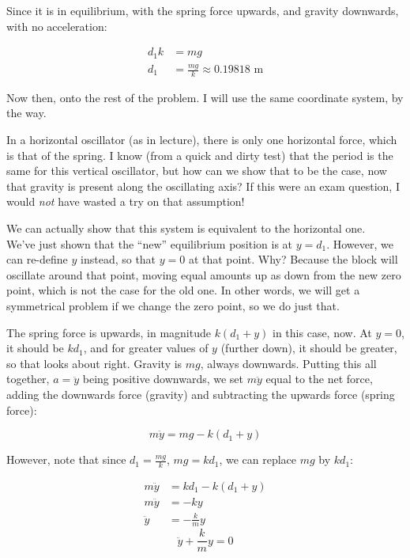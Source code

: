 \documentclass[8.01x]{subfiles}
\begin{document}
Since it is in equilibrium, with the spring force upwards, and gravity downwards, with no acceleration:

\begin{align}
d_1 k &= m g\\
d_1 &= \frac{m g}{k} \approx 0.19818 \text{ m}
\end{align}

Now then, onto the rest of the problem. I will use the same coordinate system, by the way.

In a horizontal oscillator (as in lecture), there is only one horizontal force, which is that of the spring. I know (from a quick and dirty test) that the period is the same for this vertical oscillator, but how can we show that to be the case, now that gravity is present along the oscillating axis? If this were an exam question, I would \emph{not} have wasted a try on that assumption!

We can actually show that this system is equivalent to the horizontal one.\\
We've just shown that the ``new'' equilibrium position is at $y = d_1$. However, we can re-define $y$ instead, so that $y = 0$ at that point. Why? Because the block will oscillate around that point, moving equal amounts up as down from the new zero point, which is not the case for the old one. In other words, we will get a symmetrical problem if we change the zero point, so we do just that.

The spring force is upwards, in magnitude $k (d_1 + y)$ in this case, now. At $y = 0$, it should be $k d_1$, and for greater values of $y$ (further down), it should be greater, so that looks about right. Gravity is $m g$, always downwards. Putting this all together, $a = \ddot{y}$ being positive downwards, we set $m \ddot{y}$ equal to the net force, adding the downwards force (gravity) and subtracting the upwards force (spring force):

\begin{equation}
m \ddot{y} = m g - k(d_1 + y)
\end{equation}

However, note that since $d_1 = \frac{m g}{k}$, $m g = k d_1$, we can replace $m g$ by $k d_1$:

\begin{align}
m \ddot{y} &= k d_1 - k(d_1 + y)\\
m \ddot{y} &= - k y\\
\ddot{y} &= - \frac{k}{m} y
\end{align}
\begin{equation}
\ddot{y} + \frac{k}{m} y = 0
\end{equation}
\end{document}
